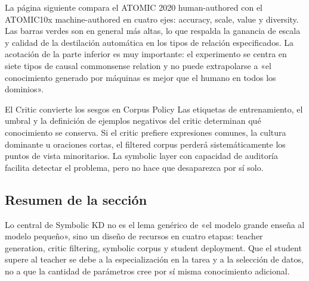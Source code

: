 
La página siguiente compara el ATOMIC 2020 human-authored con el ATOMIC10x machine-authored en cuatro ejes: accuracy, scale, value y diversity. Las barras verdes son en general más altas, lo que respalda la ganancia de escala y calidad de la destilación automática en los tipos de relación especificados. La acotación de la parte inferior es muy importante: el experimento se centra en siete tipos de causal commonsense relation y no puede extrapolarse a «el conocimiento generado por máquinas es mejor que el humano en todos los dominios».


\begin{warningbox}{El Critic convierte los sesgos en Corpus Policy}
Las etiquetas de entrenamiento, el umbral y la definición de ejemplos negativos del critic determinan qué conocimiento se conserva. Si el critic prefiere expresiones comunes, la cultura dominante u oraciones cortas, el filtered corpus perderá sistemáticamente los puntos de vista minoritarios. La symbolic layer con capacidad de auditoría facilita detectar el problema, pero no hace que desaparezca por sí solo.
\end{warningbox}

\subsection{Resumen de la sección}

Lo central de Symbolic KD no es el lema genérico de «el modelo grande enseña al modelo pequeño», sino un diseño de recursos en cuatro etapas: teacher generation, critic filtering, symbolic corpus y student deployment. Que el student supere al teacher se debe a la especialización en la tarea y a la selección de datos, no a que la cantidad de parámetros cree por sí misma conocimiento adicional.
